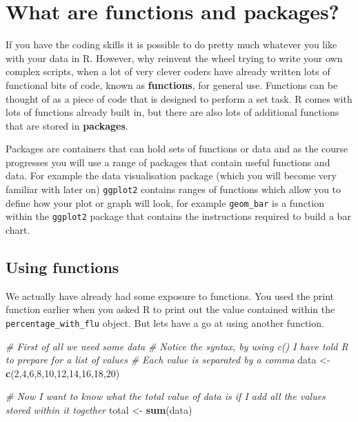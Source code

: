 \documentclass[
]{book}
\newenvironment{Shaded}{\begin{snugshade}}{\end{snugshade}}
\newcommand{\CommentTok}[1]{\textcolor[rgb]{0.56,0.35,0.01}{\textit{#1}}}
\newcommand{\DecValTok}[1]{\textcolor[rgb]{0.00,0.00,0.81}{#1}}
\newcommand{\FunctionTok}[1]{\textcolor[rgb]{0.13,0.29,0.53}{\textbf{#1}}}
\newcommand{\NormalTok}[1]{#1}
\newcommand{\OtherTok}[1]{\textcolor[rgb]{0.56,0.35,0.01}{#1}}
\begin{document}
\hypertarget{what-are-functions-and-packages}{%
\section{What are functions and packages?}\label{what-are-functions-and-packages}}

If you have the coding skills it is possible to do pretty much whatever you like with your data in R. However, why reinvent the wheel trying to write your own complex scripts, when a lot of very clever coders have already written lots of functional bits of code, known as \textbf{functions}, for general use. Functions can be thought of as a piece of code that is designed to perform a set task. R comes with lots of functions already built in, but there are also lots of additional functions that are stored in \textbf{packages}.

Packages are containers that can hold sets of functions or data and as the course progresses you will use a range of packages that contain useful functions and data. For example the data visualisation package (which you will become very familiar with later on) \texttt{ggplot2} contains ranges of functions which allow you to define how your plot or graph will look, for example \texttt{geom\_bar} is a function within the \texttt{ggplot2} package that contains the instructions required to build a bar chart.

\hypertarget{using-functions}{%
\subsection{Using functions}\label{using-functions}}

We actually have already had some exposure to functions. You used the print function earlier when you asked R to print out the value contained within the \texttt{percentage\_with\_flu} object. But lets have a go at using another function.

\begin{Shaded}
\begin{Highlighting}[]
\CommentTok{\# First of all we need some data}
\CommentTok{\# Notice the syntax, by using c() I have told R to prepare for a list of values}
\CommentTok{\# Each value is separated by a comma}
\NormalTok{data }\OtherTok{\textless{}{-}} \FunctionTok{c}\NormalTok{(}\DecValTok{2}\NormalTok{,}\DecValTok{4}\NormalTok{,}\DecValTok{6}\NormalTok{,}\DecValTok{8}\NormalTok{,}\DecValTok{10}\NormalTok{,}\DecValTok{12}\NormalTok{,}\DecValTok{14}\NormalTok{,}\DecValTok{16}\NormalTok{,}\DecValTok{18}\NormalTok{,}\DecValTok{20}\NormalTok{)}

\CommentTok{\# Now I want to know what the total value of data is if I add all the values stored within it together}
\NormalTok{total }\OtherTok{\textless{}{-}} \FunctionTok{sum}\NormalTok{(data)}
\end{Highlighting}
\end{Shaded}
\end{document}
